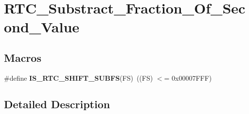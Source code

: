 \hypertarget{group___r_t_c___substract___fraction___of___second___value}{\section{R\-T\-C\-\_\-\-Substract\-\_\-\-Fraction\-\_\-\-Of\-\_\-\-Second\-\_\-\-Value}
\label{group___r_t_c___substract___fraction___of___second___value}
}
\subsection*{Macros}
\begin{DoxyCompactItemize}
\item 
\hypertarget{group___r_t_c___substract___fraction___of___second___value_ga8ad118d512f7dc9ce3d4b6669fd3f4b4}{\#define {\bfseries I\-S\-\_\-\-R\-T\-C\-\_\-\-S\-H\-I\-F\-T\-\_\-\-S\-U\-B\-F\-S}(F\-S)~((F\-S) $<$= 0x00007\-F\-F\-F)}\label{group___r_t_c___substract___fraction___of___second___value_ga8ad118d512f7dc9ce3d4b6669fd3f4b4}

\end{DoxyCompactItemize}


\subsection{Detailed Description}
